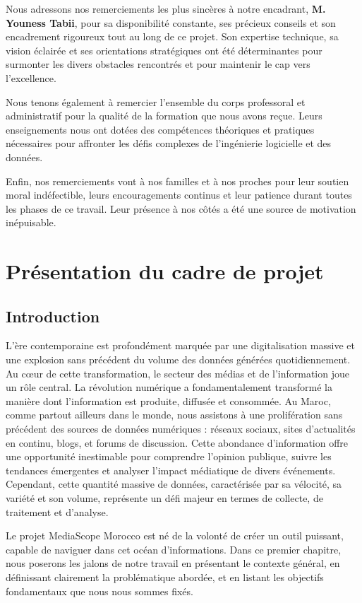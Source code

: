 \documentclass[12pt,a4paper,oneside]{report}
\newcommand{\texteContexteA}{
La révolution numérique a fondamentalement transformé la manière dont l'information est produite, diffusée et consommée. Au Maroc, comme partout ailleurs dans le monde, nous assistons à une prolifération sans précédent des sources de données numériques : réseaux sociaux, sites d'actualités en continu, blogs, et forums de discussion. Cette abondance d'information offre une opportunité inestimable pour comprendre l'opinion publique, suivre les tendances émergentes et analyser l'impact médiatique de divers événements. Cependant, cette quantité massive de données, caractérisée par sa vélocité, sa variété et son volume, représente un défi majeur en termes de collecte, de traitement et d'analyse.
}
\begin{document}
Nous adressons nos remerciements les plus sincères à notre encadrant, \textbf{M. Youness Tabii}, pour sa disponibilité constante, ses précieux conseils et son encadrement rigoureux tout au long de ce projet. Son expertise technique, sa vision éclairée et ses orientations stratégiques ont été déterminantes pour surmonter les divers obstacles rencontrés et pour maintenir le cap vers l'excellence.

Nous tenons également à remercier l'ensemble du corps professoral et administratif pour la qualité de la formation que nous avons reçue. Leurs enseignements nous ont dotées des compétences théoriques et pratiques nécessaires pour affronter les défis complexes de l'ingénierie logicielle et des données.

Enfin, nos remerciements vont à nos familles et à nos proches pour leur soutien moral indéfectible, leurs encouragements continus et leur patience durant toutes les phases de ce travail. Leur présence à nos côtés a été une source de motivation inépuisable.

\newpage

\tableofcontents
\newpage
\listoffigures
\newpage
\listoftables
\newpage


\chapter{Présentation du cadre de projet}

\section{Introduction}
L'ère contemporaine est profondément marquée par une digitalisation massive et une explosion sans précédent du volume des données générées quotidiennement. Au cœur de cette transformation, le secteur des médias et de l'information joue un rôle central. \texteContexteA

Le projet MediaScope Morocco est né de la volonté de créer un outil puissant, capable de naviguer dans cet océan d'informations. Dans ce premier chapitre, nous poserons les jalons de notre travail en présentant le contexte général, en définissant clairement la problématique abordée, et en listant les objectifs fondamentaux que nous nous sommes fixés.
\end{document}
